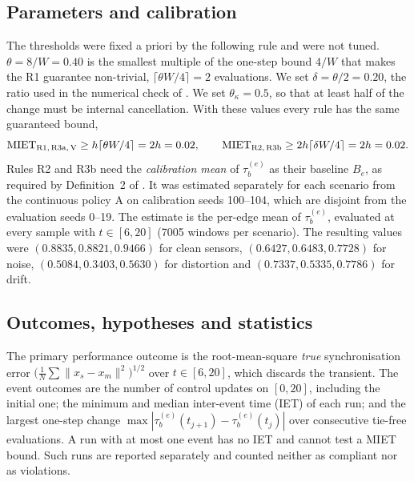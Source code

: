 \documentclass[10pt,a4paper]{article}
\newcommand{\te}{\tau_b^{(e)}}
\newcommand{\MIET}{\mathrm{MIET}}
\newcommand{\R}[1]{\textup{R#1}}
\begin{document}
\subsection{Parameters and calibration}\label{sec:calib}

The thresholds were fixed a priori by the following rule and were not tuned. $\theta=8/W=0.40$ is the smallest multiple of the one-step bound $4/W$ that makes the \R{1} guarantee non-trivial, $\lceil\theta W/4\rceil=2$ evaluations. We set $\delta=\theta/2=0.20$, the ratio used in the numerical check of \citep{pv2026miet}. We set $\theta_\kappa=0.5$, so that at least half of the change must be internal cancellation. With these values every rule has the same guaranteed bound,
\begin{equation}\label{eq:bound}
\MIET_{\R1,\,\R3\mathrm a,\,\mathrm V}\ge h\lceil\theta W/4\rceil=2h=0.02,\qquad \MIET_{\R2,\,\R3\mathrm b}\ge 2h\lceil\delta W/4\rceil=2h=0.02 .
\end{equation}
Rules \R{2} and \R{3}b need the \emph{calibration mean} of $\te$ as their baseline $B_e$, as required by Definition~2 of \citep{pv2026miet}. It was estimated separately for each scenario from the continuous policy A on calibration seeds 100--104, which are disjoint from the evaluation seeds 0--19. The estimate is the per-edge mean of $\te$, evaluated at every sample with $t\in[6,20]$ (7005 windows per scenario). The resulting values were $(0.8835,0.8821,0.9466)$ for clean sensors, $(0.6427,0.6483,0.7728)$ for noise, $(0.5084,0.3403,0.5630)$ for distortion and $(0.7337,0.5335,0.7786)$ for drift.

\subsection{Outcomes, hypotheses and statistics}\label{sec:stats}

The primary performance outcome is the root-mean-square \emph{true} synchronisation error $\big(\frac1N\sum\|x_s-x_m\|^2\big)^{1/2}$ over $t\in[6,20]$, which discards the transient. The event outcomes are the number of control updates on $[0,20]$, including the initial one; the minimum and median inter-event time (IET) of each run; and the largest one-step change $\max|\te(t_{j+1})-\te(t_j)|$ over consecutive tie-free evaluations. A run with at most one event has no IET and cannot test a MIET bound. Such runs are reported separately and counted neither as compliant nor as violations.
\end{document}
